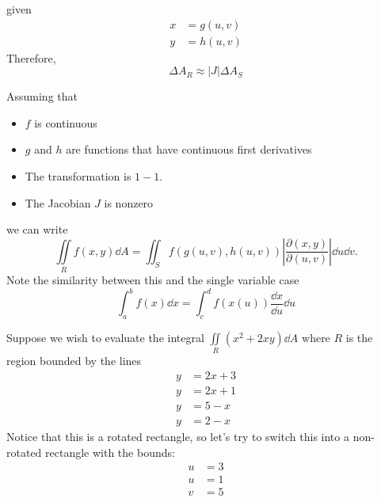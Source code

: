 \begin{itemize}
\begin{definition}
\begin{equation}
        \end{equation}
        given 
        \begin{align}
            x &= g(u,v) \\ 
            y &= h(u,v)
        \end{align}
        Therefore, 
        \begin{equation}
            \Delta A_R \approx |J|\Delta A_S
        \end{equation}
    \end{definition}
    \begin{theorem}
        Assuming that 
        \begin{itemize}
            \item $f$ is continuous
            \item $g$ and $h$ are functions that have continuous first derivatives
            \item The transformation is $1-1$.
            \item The Jacobian $J$ is nonzero
        \end{itemize}
        we can write 
        \begin{equation}
            \iint\limits_R f(x,y)\dd{A} = \iint_S f(g(u,v),h(u,v))\left|\frac{\partial(x,y)}{\partial(u,v)}\right|\dd{u}\dd{v}.
        \end{equation}
        Note the similarity between this and the single variable case 
        \begin{equation}
            \int_a^b f(x) \dd{x} = \int_c^d f(x(u)) \frac{\dd{x}}{\dd{u}} \dd{u}
        \end{equation}
    \end{theorem}
    \begin{example}
        Suppose we wish to evaluate the integral $\iint\limits_R (x^2+2xy)\dd{A}$ where $R$ is the region bounded by the lines 
        \begin{align}
            y &= 2x+3 \\ 
            y &= 2x+1 \\ 
            y &= 5-x \\ 
            y &= 2-x
        \end{align}
        Notice that this is a rotated rectangle, so let's try to switch this into a non-rotated rectangle with the bounds: 
        \begin{align}
            u &= 3 \\ 
            u &= 1 \\ 
            v &= 5 \\ 

\end{align}
\end{example}
\end{itemize}
